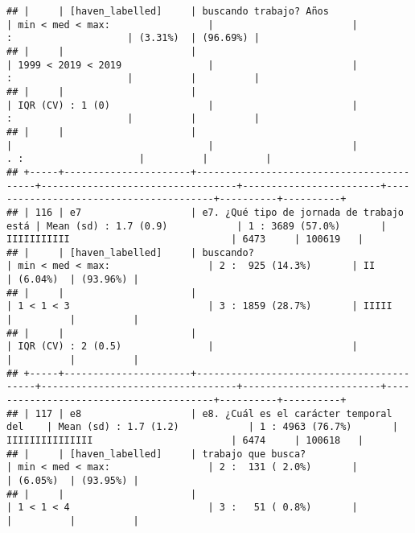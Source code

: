 \documentclass[]{article}
\begin{document}
\begin{verbatim}
## |     | [haven_labelled]     | buscando trabajo? Años                   | min < med < max:                 |                        |                   :                    | (3.31%)  | (96.69%) |
## |     |                      |                                          | 1999 < 2019 < 2019               |                        |                   :                    |          |          |
## |     |                      |                                          | IQR (CV) : 1 (0)                 |                        |                   :                    |          |          |
## |     |                      |                                          |                                  |                        |                 . :                    |          |          |
## +-----+----------------------+------------------------------------------+----------------------------------+------------------------+----------------------------------------+----------+----------+
## | 116 | e7                   | e7. ¿Qué tipo de jornada de trabajo está | Mean (sd) : 1.7 (0.9)            | 1 : 3689 (57.0%)       | IIIIIIIIIII                            | 6473     | 100619   |
## |     | [haven_labelled]     | buscando?                                | min < med < max:                 | 2 :  925 (14.3%)       | II                                     | (6.04%)  | (93.96%) |
## |     |                      |                                          | 1 < 1 < 3                        | 3 : 1859 (28.7%)       | IIIII                                  |          |          |
## |     |                      |                                          | IQR (CV) : 2 (0.5)               |                        |                                        |          |          |
## +-----+----------------------+------------------------------------------+----------------------------------+------------------------+----------------------------------------+----------+----------+
## | 117 | e8                   | e8. ¿Cuál es el carácter temporal del    | Mean (sd) : 1.7 (1.2)            | 1 : 4963 (76.7%)       | IIIIIIIIIIIIIII                        | 6474     | 100618   |
## |     | [haven_labelled]     | trabajo que busca?                       | min < med < max:                 | 2 :  131 ( 2.0%)       |                                        | (6.05%)  | (93.95%) |
## |     |                      |                                          | 1 < 1 < 4                        | 3 :   51 ( 0.8%)       |                                        |          |          |

\end{verbatim}
\end{document}
